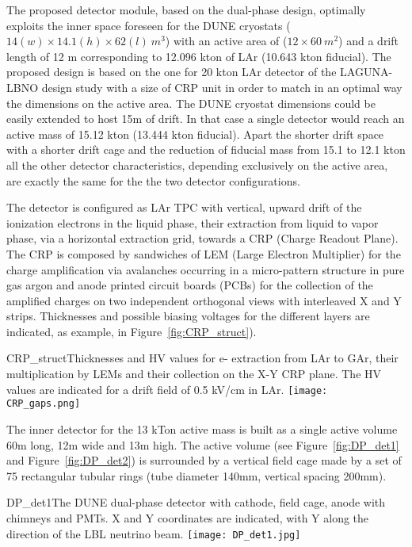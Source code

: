The proposed detector module, based on the dual-phase design, optimally exploits the inner space foreseen for the DUNE cryostats ($14 (w) \times 14.1 (h) \times 62  (l)~m^3$) with an active area of  ($12 \times 60 ~m^2$) and a drift length of 12 m corresponding to 12.096 kton of LAr (10.643 kton fiducial). The proposed design is based on the one for 20 kton LAr detector of the LAGUNA-LBNO design study with a size of CRP unit in order to match in an optimal way the dimensions on the active area. The DUNE cryostat dimensions could be easily extended to host 15m of drift. In that case a single detector would reach an active mass of 15.12 kton (13.444 kton fiducial).  Apart the shorter drift space with a shorter drift cage and the reduction of fiducial mass from 15.1 to 12.1 kton all the other detector characteristics, depending exclusively on the active area, are exactly the same for the the two detector configurations.

The detector is configured as LAr TPC with vertical, upward drift of the ionization electrons in the liquid phase, their extraction from liquid to vapor phase, via a horizontal extraction grid, towards a CRP (Charge Readout Plane). The CRP is composed by sandwiches of LEM (Large Electron Multiplier) for the charge amplification via avalanches occurring in a micro-pattern structure in pure gas argon and anode printed circuit boards (PCBs) for  the collection of the amplified charges on two independent orthogonal views with interleaved X and Y strips. Thicknesses and possible biasing voltages for the different layers are indicated, as example, in Figure~\ref{fig:CRP_struct}). 

\begin{cdrfigure}{CRP_struct}{Thicknesses and HV values for e- extraction from LAr to GAr, their multiplication by LEMs and their collection on the X-Y CRP plane. The HV values are indicated for a drift field of 0.5 kV/cm in LAr.}
\texttt{[image: CRP\_gaps.png]}
\end{cdrfigure}

The inner detector for the 13 kTon active mass is built as a single active volume 60m long, 12m wide and 13m high. The active volume (see Figure~\ref{fig:DP_det1} and Figure~\ref{fig:DP_det2}) is surrounded by a vertical field cage made by a set of 75 rectangular tubular rings (tube diameter 140mm, vertical spacing 200mm).

\begin{cdrfigure}{DP_det1}{The DUNE dual-phase detector with cathode, field cage, anode with chimneys and PMTs. X and Y coordinates are indicated, with Y along the direction of the LBL neutrino beam.}
\texttt{[image: DP\_det1.jpg]}
\end{cdrfigure}

